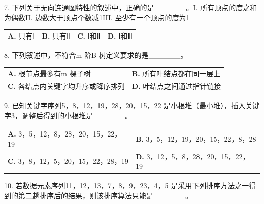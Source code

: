 \documentclass[UTF8,11pt]{ctexart}
\begin{document}
7. 下列关于无向连通图特性的叙述中，正确的是\_\_\_\_\_\_。I. 所有顶点的度之和为偶数II. 边数大于顶点个数减1III. 至少有一个顶点的度为1


\begin{center}\begin{tabular}{>{\raggedright\arraybackslash}p{\dimexpr(\linewidth-8\tabcolsep)/4\relax}>{\raggedright\arraybackslash}p{\dimexpr(\linewidth-8\tabcolsep)/4\relax}>{\raggedright\arraybackslash}p{\dimexpr(\linewidth-8\tabcolsep)/4\relax}>{\raggedright\arraybackslash}p{\dimexpr(\linewidth-8\tabcolsep)/4\relax}}
\textbf{A.} 只有Ⅰ & \textbf{B.} 只有Ⅱ & \textbf{C.} Ⅰ和Ⅱ & \textbf{D.} Ⅰ和Ⅲ\\[.35em]\end{tabular}\end{center}

8. 下列叙述中，不符合m 阶B 树定义要求的是\_\_\_\_\_\_。


\begin{center}\begin{tabular}{>{\raggedright\arraybackslash}p{\dimexpr(\linewidth-4\tabcolsep)/2\relax}>{\raggedright\arraybackslash}p{\dimexpr(\linewidth-4\tabcolsep)/2\relax}}
\textbf{A.} 根节点最多有m 棵子树 & \textbf{B.} 所有叶结点都在同一层上\\[.35em]
\textbf{C.} 各结点内关键字均升序或降序排列 & \textbf{D.} 叶结点之间通过指针链接\\[.35em]\end{tabular}\end{center}

9. 已知关键字序列5，8，12，19，28，20，15，22 是小根堆（最小堆），插入关键字3，调整后得到的小根堆是\_\_\_\_\_\_。


\begin{center}\begin{tabular}{>{\raggedright\arraybackslash}p{\dimexpr(\linewidth-4\tabcolsep)/2\relax}>{\raggedright\arraybackslash}p{\dimexpr(\linewidth-4\tabcolsep)/2\relax}}
\textbf{A.} 3，5，12，8，28，20，15，22，19 & \textbf{B.} 3，5，12，19，20，15，22，8，28\\[.35em]
\textbf{C.} 3，8，12，5，20，15，22，28，19 & \textbf{D.} 3，12，5，8，28，20，15，22，19\\[.35em]\end{tabular}\end{center}

10. 若数据元素序列11，12，13，7，8，9，23，4，5 是采用下列排序方法之一得到的第二趟排序后的结果，则该排序算法只能是\_\_\_\_\_\_。
\end{document}
